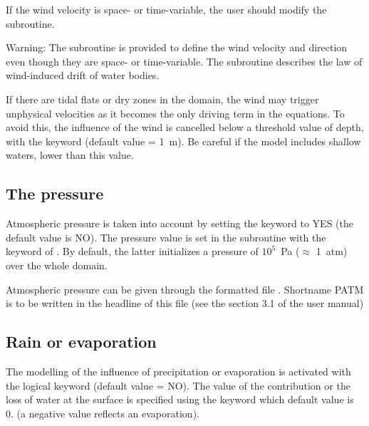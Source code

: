 If the wind velocity is space- or time-variable, the user should modify the
 subroutine.

\begin{WarningBlock}{Warning:}
The  subroutine is provided to define the wind velocity and
direction even though they are space- or time-variable.
The  subroutine describes the law of wind-induced drift
of water bodies.
\end{WarningBlock}

If there are tidal flats or dry zones in the domain, the wind may trigger
unphysical velocities as it becomes the only driving term in the equations.
To avoid this, the influence of the wind is cancelled below a threshold value
of depth, with the keyword 
(default value = 1~m).
Be careful if the model includes shallow waters, lower than this value.





\subsection{The pressure}

Atmospheric pressure is taken into account by setting the keyword
 to YES (the default value is NO).
The pressure value is set in the  subroutine
with the keyword of .
By default, the latter initializes a pressure of $10^5$~Pa ($\approx$ 1~atm) over
the whole domain.

Atmospheric pressure can be given through the formatted file
.
Shortname PATM is to be written in the headline of this file (see the section 3.1
of the \waqtel user manual)

\subsection{Rain or evaporation}

The modelling of the influence of precipitation or evaporation is activated
with the logical keyword  (default value = NO).
The value of the
contribution or the loss of water at the surface is specified using the keyword
 which default value is 0. (a
negative value reflects an evaporation).\\


